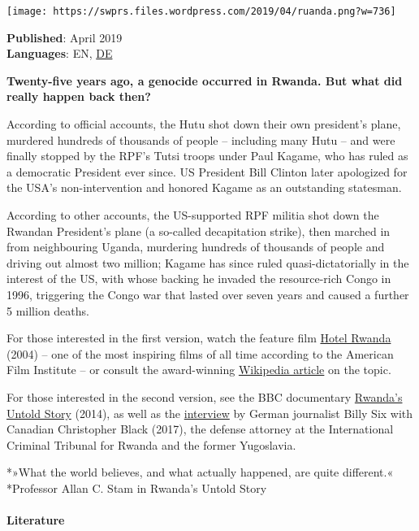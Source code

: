 \texttt{[image: https://swprs.files.wordpress.com/2019/04/ruanda.png?w=736]}

\textbf{Published}: April 2019\\
\textbf{Languages}: EN,
\href{https://swprs.org/ruanda-was-geschah-wirklich/}{DE}

\textbf{Twenty-five years ago, a genocide occurred in Rwanda. But what
did really happen back then?}

According to official accounts, the Hutu shot down their own president's
plane, murdered hundreds of thousands of people -- including many Hutu
-- and were finally stopped by the RPF's Tutsi troops under Paul Kagame,
who has ruled as a democratic President ever since. US President Bill
Clinton later apologized for the USA's non-intervention and honored
Kagame as an outstanding statesman.

According to other accounts, the US-supported RPF militia shot down the
Rwandan President's plane (a so-called decapitation strike), then
marched in from neighbouring Uganda, murdering hundreds of thousands of
people and driving out almost two million; Kagame has since ruled
quasi-dictatorially in the interest of the US, with whose backing he
invaded the resource-rich Congo in 1996, triggering the Congo war that
lasted over seven years and caused a further 5 million deaths.

For those interested in the first version, watch the feature film
\href{https://www.youtube.com/watch?v=qZzfxL90100}{Hotel Rwanda} (2004)
-- one of the most inspiring films of all time according to the American
Film Institute -- or consult the award-winning
\href{https://en.wikipedia.org/wiki/Rwandan_genocide}{Wikipedia article}
on the topic.

For those interested in the second version, see the BBC documentary
\href{https://vimeo.com/107867605}{Rwanda's Untold Story} (2014), as
well as the
\href{https://www.youtube.com/watch?v=ChBxPzyAJak}{interview} by German
journalist Billy Six with Canadian Christopher Black (2017), the defense
attorney at the International Criminal Tribunal for Rwanda and the
former Yugoslavia.

*»What the world believes, and what actually happened, are quite
different.«\\
*Professor Allan C. Stam in Rwanda's Untold Story

\hypertarget{literature}{%
\paragraph{Literature}\label{literature}}


